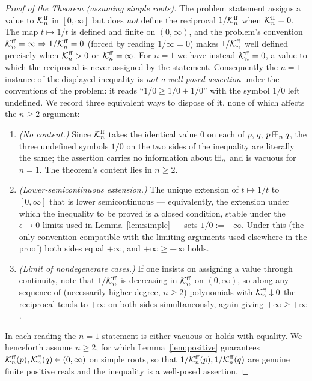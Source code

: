 \begin{proof}[Proof of the Theorem (assuming simple roots)]
The problem statement assigns a value to $\mathcal{K}^{\mathrm{ff}}_n$ in $[0,\infty]$ but does
\emph{not} define the reciprocal $1/\mathcal{K}^{\mathrm{ff}}_n$ when $\mathcal{K}^{\mathrm{ff}}_n=0$. The map
$t\mapsto 1/t$ is defined and finite on $(0,\infty)$, and the problem's convention
$\mathcal{K}^{\mathrm{ff}}_n=\infty\Rightarrow 1/\mathcal{K}^{\mathrm{ff}}_n=0$ (forced by reading $1/\infty=0$) makes
$1/\mathcal{K}^{\mathrm{ff}}_n$ well defined precisely when $\mathcal{K}^{\mathrm{ff}}_n>0$ or $\mathcal{K}^{\mathrm{ff}}_n=\infty$.
For $n=1$ we have instead $\mathcal{K}^{\mathrm{ff}}_n=0$, a value to which the reciprocal is never
assigned by the statement. Consequently the $n=1$ instance of the displayed
inequality is \emph{not a well-posed assertion} under the conventions of the
problem: it reads ``$1/0\ge 1/0+1/0$'' with the symbol $1/0$ left undefined. We
record three equivalent ways to dispose of it, none of which affects the $n\ge2$
argument:
\begin{enumerate}\setlength\itemsep{2pt}
\item \emph{(No content.)} Since $\mathcal{K}^{\mathrm{ff}}_n$ takes the identical value $0$ on each
of $p$, $q$, $p\boxplus_n q$, the three undefined symbols $1/0$ on the two sides of
the inequality are literally the same; the assertion carries no information about
$\boxplus_n$ and is vacuous for $n=1$. The theorem's content lies in $n\ge2$.
\item \emph{(Lower-semicontinuous extension.)} The unique extension of
$t\mapsto 1/t$ to $[0,\infty]$ that is lower semicontinuous — equivalently, the
extension under which the inequality to be proved is a closed condition, stable
under the $\epsilon\to0$ limits used in Lemma~\ref{lem:simple} — sets
$1/0:=+\infty$. Under this (the only convention compatible with the limiting
arguments used elsewhere in the proof) both sides equal $+\infty$, and
$+\infty\ge+\infty$ holds.
\item \emph{(Limit of nondegenerate cases.)} If one insists on assigning a value
through continuity, note that $1/\mathcal{K}^{\mathrm{ff}}_n$ is decreasing in $\mathcal{K}^{\mathrm{ff}}_n$ on
$(0,\infty)$, so along any sequence of (necessarily higher-degree, $n\ge2$)
polynomials with $\mathcal{K}^{\mathrm{ff}}_n\downarrow0$ the reciprocal tends to $+\infty$ on both
sides simultaneously, again giving $+\infty\ge+\infty$.
\end{enumerate}
In each reading the $n=1$ statement is either vacuous or holds with equality. We
henceforth assume $n\ge2$, for which Lemma~\ref{lem:positive} guarantees
$\mathcal{K}^{\mathrm{ff}}_n(p),\mathcal{K}^{\mathrm{ff}}_n(q)\in(0,\infty)$ on simple roots, so that
$1/\mathcal{K}^{\mathrm{ff}}_n(p),1/\mathcal{K}^{\mathrm{ff}}_n(q)$ are genuine finite positive reals and the
inequality is a well-posed assertion.


\end{proof}
